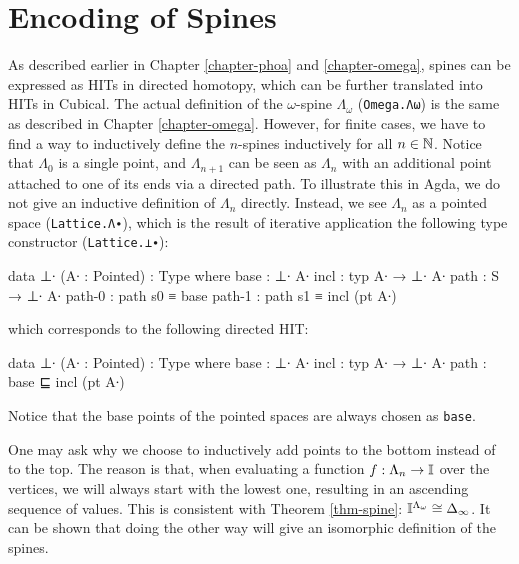 \section{Encoding of Spines}
As described earlier in Chapter \ref{chapter-phoa} and \ref{chapter-omega}, spines can be expressed as HITs in directed homotopy, which can be further translated into HITs in Cubical. The actual definition of the $\omega$-spine $\Lambda_\omega$ (\verb|Omega.Λω|) is the same as described in Chapter \ref{chapter-omega}. However, for finite cases, we have to find a way to inductively define the $n$-spines inductively for all $n\in\mathbb{N}$. Notice that $\Lambda_0$ is a single point, and $\Lambda_{n+1}$ can be seen as $\Lambda_n$ with an additional point attached to one of its ends via a directed path. To illustrate this in Agda, we do not give an inductive definition of $\Lambda_n$ directly. Instead, we see $\Lambda_n$ as a pointed space (\verb|Lattice.Λ∙|), which is the result of iterative application the following type constructor (\verb|Lattice.⊥∙|):
\begin{code}
data ⊥∙ (A∙ : Pointed) : Type where
    base : ⊥∙ A∙
    incl : typ A∙ → ⊥∙ A∙
    path : S → ⊥∙ A∙
    path-0 : path s0 ≡ base
    path-1 : path s1 ≡ incl (pt A∙)
\end{code}
which corresponds to the following directed HIT:
\begin{code}
data ⊥∙ (A∙ : Pointed) : Type where
    base : ⊥∙ A∙
    incl : typ A∙ → ⊥∙ A∙
    path : base ⊑ incl (pt A∙)
\end{code}
Notice that the base points of the pointed spaces are always chosen as \verb|base|.

One may ask why we choose to inductively add points to the bottom instead of to the top. The reason is that, when evaluating a function $f:\Lambda_n\to\mathbb{I}$ over the vertices, we will always start with the lowest one, resulting in an ascending sequence of values. This is consistent with Theorem \ref{thm-spine}: $\mathbb{I}^{\Lambda_\omega}\cong\Delta_\infty$. It can be shown that doing the other way will give an isomorphic definition of the spines.

